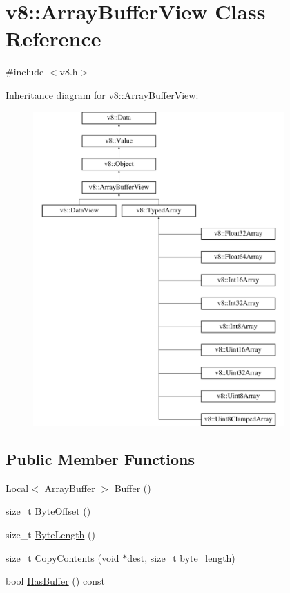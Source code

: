 \hypertarget{classv8_1_1ArrayBufferView}{}\section{v8\+:\+:Array\+Buffer\+View Class Reference}
\label{classv8_1_1ArrayBufferView}


{\ttfamily \#include $<$v8.\+h$>$}

Inheritance diagram for v8\+:\+:Array\+Buffer\+View\+:\begin{figure}[H]
\begin{center}
\leavevmode
\includegraphics[height=12.000000cm]{classv8_1_1ArrayBufferView}
\end{center}
\end{figure}
\subsection*{Public Member Functions}
\begin{DoxyCompactItemize}
\item 
\hyperlink{classv8_1_1Local}{Local}$<$ \hyperlink{classv8_1_1ArrayBuffer}{Array\+Buffer} $>$ \hyperlink{classv8_1_1ArrayBufferView_a2ceba3908fbf98ecc81702083127b046}{Buffer} ()
\item 
size\+\_\+t \hyperlink{classv8_1_1ArrayBufferView_a4739a31269f5ebc5b88a708b9429c688}{Byte\+Offset} ()
\item 
size\+\_\+t \hyperlink{classv8_1_1ArrayBufferView_a9fc7563c97e0b639a6c0a3274995bb3c}{Byte\+Length} ()
\item 
size\+\_\+t \hyperlink{classv8_1_1ArrayBufferView_aa728e762ed43194f3a5e05e792fff64e}{Copy\+Contents} (void $\ast$dest, size\+\_\+t byte\+\_\+length)
\item 
bool \hyperlink{classv8_1_1ArrayBufferView_ab3a7de283cab4140632d190a1e3eef22}{Has\+Buffer} () const 
\end{DoxyCompactItemize}

